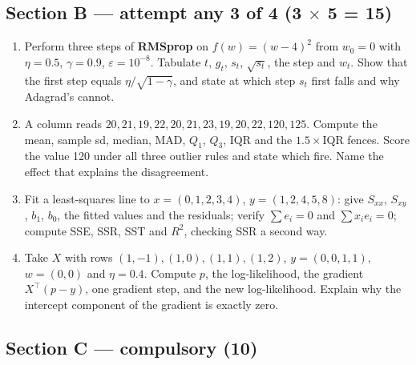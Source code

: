 \documentclass[11pt,a4paper]{article}
\begin{document}
\subsection*{Section B --- attempt any 3 of 4 \quad (3 $\times$ 5 = 15)}

\begin{enumerate}[label=\textbf{\arabic*.}, leftmargin=*, start=6]
\item Perform three steps of \textbf{RMSprop} on $f(w) = (w-4)^2$ from
  $w_0 = 0$ with $\eta = 0.5$, $\gamma = 0.9$, $\varepsilon = 10^{-8}$.
  Tabulate $t$, $g_t$, $s_t$, $\sqrt{s_t}$, the step and $w_t$. Show that the
  first step equals $\eta/\sqrt{1-\gamma}$, and state at which step $s_t$ first
  falls and why Adagrad's cannot. 
\item A column reads $20, 21, 19, 22, 20, 21, 23, 19, 20, 22, 120, 125$.
  Compute the mean, sample sd, median, MAD, $Q_1$, $Q_3$, IQR and the
  $1.5\times$IQR fences. Score the value 120 under all three outlier rules and
  state which fire. Name the effect that explains the disagreement. 
\item Fit a least-squares line to $x = (0,1,2,3,4)$, $y = (1,2,4,5,8)$:
  give $S_{xx}$, $S_{xy}$, $b_1$, $b_0$, the fitted values and the residuals;
  verify $\sum e_i = 0$ and $\sum x_ie_i = 0$; compute SSE, SSR, SST and
  $R^2$, checking SSR a second way. 
\item Take $X$ with rows $(1,-1), (1,0), (1,1), (1,2)$, $y = (0,0,1,1)$,
  $w = (0,0)$ and $\eta = 0.4$. Compute $p$, the log-likelihood, the gradient
  $X^\top(p-y)$, one gradient step, and the new log-likelihood. Explain why
  the intercept component of the gradient is exactly zero. 
\end{enumerate}

\subsection*{Section C --- compulsory \quad (10)}
\end{document}
